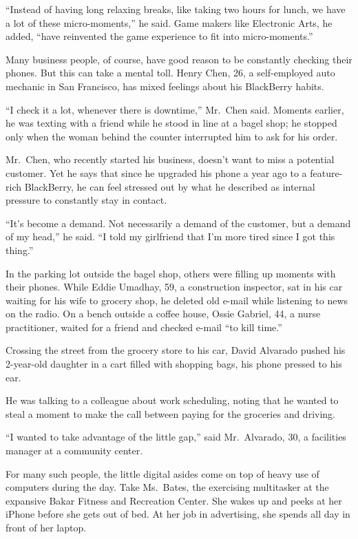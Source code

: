 ﻿\documentclass[12pt]{article}
\begin{document}
``Instead of having long relaxing breaks, like taking two hours for lunch, we have a lot of these
micro-moments,'' he said. Game makers like Electronic Arts, he added, ``have reinvented the game
experience to fit into micro-moments.''

Many business people, of course, have good reason to be constantly checking their phones. But this
can take a mental toll. Henry Chen, 26, a self-employed auto mechanic in San Francisco, has mixed
feelings about his BlackBerry habits.

``I check it a lot, whenever there is downtime,'' Mr.~Chen said. Moments earlier, he was texting
with a friend while he stood in line at a bagel shop; he stopped only when the woman behind the
counter interrupted him to ask for his order.

Mr.~Chen, who recently started his business, doesn't want to miss a potential customer. Yet he says
that since he upgraded his phone a year ago to a feature-rich BlackBerry, he can feel stressed out
by what he described as internal pressure to constantly stay in contact.

``It's become a demand. Not necessarily a demand of the customer, but a demand of my head,'' he
said. ``I told my girlfriend that I'm more tired since I got this thing.''

In the parking lot outside the bagel shop, others were filling up moments with their phones. While
Eddie Umadhay, 59, a construction inspector, sat in his car waiting for his wife to grocery shop, he
deleted old e-mail while listening to news on the radio. On a bench outside a coffee house, Ossie
Gabriel, 44, a nurse practitioner, waited for a friend and checked e-mail ``to kill time.''

Crossing the street from the grocery store to his car, David Alvarado pushed his 2-year-old daughter
in a cart filled with shopping bags, his phone pressed to his ear.

He was talking to a colleague about work scheduling, noting that he wanted to steal a moment to make
the call between paying for the groceries and driving.

``I wanted to take advantage of the little gap,'' said Mr.~Alvarado, 30, a facilities manager at a
community center.

For many such people, the little digital asides come on top of heavy use of computers during the
day. Take Ms.~Bates, the exercising multitasker at the expansive Bakar Fitness and Recreation
Center. She wakes up and peeks at her iPhone before she gets out of bed. At her job in advertising,
she spends all day in front of her laptop.
\end{document}
